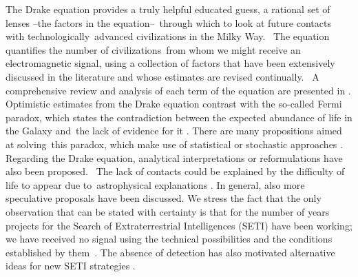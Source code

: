 \documentclass[crop]{CSLB}
\begin{document}
The Drake equation  \citep{drake_intelligent_1962} provides a truly
helpful educated guess, a rational set of lenses –the factors in the
equation– through which to look at future contacts with
technologically advanced civilizations in the Milky Way. 
%
The equation quantifies the number of civilizations from whom we might
receive an electromagnetic signal, using a collection of factors that
have been extensively discussed in the literature and whose estimates
are revised continually. 
%
A comprehensive review and analysis of each term of the equation are
presented in \citet{vakoch_drake_2015}.
%
Optimistic estimates from the Drake equation contrast with the
so-called Fermi paradox, which states the contradiction between the
expected abundance of life in the Galaxy and the lack of evidence for
it \citep[e.g. ][]{hart_explanation_1975, brin_great_1983,
barlow_galactic_2012, forgan_galactic_2016, vanhouten_isthere_2017,
Sotos_biotechnology_2019, carroll_nellemback_fermi_2019}.
%
There are many propositions aimed at solving this paradox, which make
use of statistical \citep{solomonides_probabilistic_2016,
vanhouten_isthere_2017, horvat_calculating_2007,
maccone_statistical_2015} or stochastic approaches
\citep{forgan_numerical_2009, bloetscher_using_2019,
glade_stochastic_2011, forgan_numerical_2010}.
%
Regarding the Drake equation, analytical interpretations
\citep{prantzos_joint_2013, smith_broadcasting_2009} or reformulations
\citep[][and references therein]{burchell_whither_2006} have also been
proposed. 
%
The lack of contacts could be explained by the difficulty of life to
appear due to astrophysical explanations
\citep{annis_astrophysical_1999}.
%
In general, also more speculative proposals
\citep{barlow_galactic_2013, lampton_information_2013,
conway_three_2018, forgan_galactic_2017} have been discussed.
% 
% 
% 
% 
% 
% 
% 
% 
% 
% 
% 
\Fpagebreak
%
We stress the fact that the only observation that can be stated with certainty is that for the number of years projects for the Search of Extraterrestrial Intelligences (SETI) have been working; we have received no signal using the technical possibilities and the conditions established by them \citep{tarter_search_2001}.
%
The absence of detection has also motivated alternative ideas for new SETI strategies \citep{forgan_exoplanet_2017, balbi_impact_2018, loeb_eavesdropping_2006, maccone_KLT_2010, tarter_advancing_2009, enriquez_breakthrough_2017, loeb_relative_2016, maccone_SETI_2011, lingam_relative_2019, wright_theGsearch_2015, maccone_SETI_2013, maccone_lognormals_2014, harp_application_2018, forgan_possibility_2013, forgan_galactic_2017, funes_searching_2019}.
\end{document}
